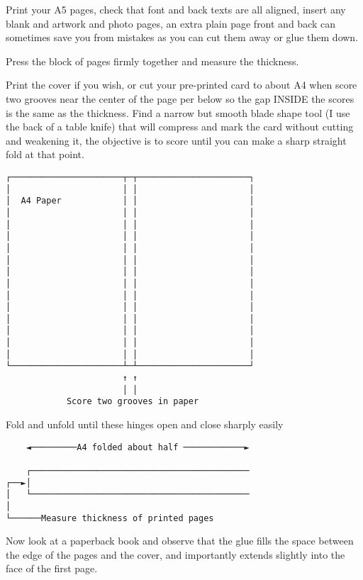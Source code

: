 \documentclass[
]{article}
\begin{document}
Print your A5 pages, check that font and back texts are all aligned,
insert any blank and artwork and photo pages, an extra plain page front
and back can sometimes save you from mistakes as you can cut them away
or glue them down.

Press the block of pages firmly together and measure the thickness.

Print the cover if you wish, or cut your pre-printed card to about A4
when score two grooves near the center of the page per below so the gap
INSIDE the scores is the same as the thickness. Find a narrow but smooth
blade shape tool (I use the back of a table knife) that will compress
and mark the card without cutting and weakening it, the objective is to
score until you can make a sharp straight fold at that point.

\begin{verbatim}
┌──────────────────────┬─┬──────────────────────┐
│                      │ │                      │
│  A4 Paper            │ │                      │
│                      │ │                      │
│                      │ │                      │
│                      │ │                      │
│                      │ │                      │
│                      │ │                      │
│                      │ │                      │
│                      │ │                      │
│                      │ │                      │
│                      │ │                      │
│                      │ │                      │
│                      │ │                      │
│                      │ │                      │
│                      │ │                      │
└──────────────────────┴─┴──────────────────────┘
                       ↑ ↑
                       │ │
            Score two grooves in paper
\end{verbatim}

Fold and unfold until these hinges open and close sharply easily

\begin{verbatim}
    ◄─────────A4 folded about half ────────────►

    ┌───────────────────────────────────────────
┌──►│
│   └───────────────────────────────────────────
│
└──────Measure thickness of printed pages
\end{verbatim}

Now look at a paperback book and observe that the glue fills the space
between the edge of the pages and the cover, and importantly extends
slightly into the face of the first page.
\end{document}
